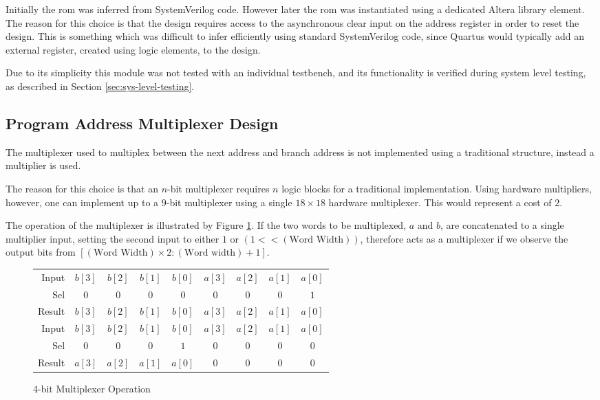 Initially the \gls{rom} was inferred from SystemVerilog code. However later the \gls{rom} was instantiated using a dedicated Altera library element. The reason for this choice is that the design requires access to the asynchronous clear input on the address register in order to reset the design. This is something which was difficult to infer efficiently using standard SystemVerilog code, since Quartus would typically add an external register, created using logic elements, to the design.

Due to its simplicity this module was not tested with an individual testbench, and its functionality is verified during system level testing, as described in Section \ref{sec:sys-level-testing}.

\subsection{Program Address Multiplexer Design} \label{sec:mux-design}
The multiplexer used to multiplex between the next address and branch address is not implemented using a traditional structure, instead a multiplier is used.

The reason for this choice is that an $n$-bit multiplexer requires $n$ logic blocks for a traditional implementation. Using hardware multipliers, however, one can implement up to a $9$-bit multiplexer using a single $18 \times 18$ hardware multiplexer. This would represent a cost of $2$.

The operation of the multiplexer is illustrated by Figure \ref{fig:mux-operation}. If the two words to be multiplexed, $a$ and $b$, are concatenated to a single multiplier input, setting the second input to either $1$ or $(1 << (\text{Word Width}))$, therefore acts as a multiplexer if we observe the output bits from $[(\text{Word Width}) \times 2: (\text{Word width}) + 1]$.

\begin{figure}[ht]
	\centering
	\begin{tabular}{r *{8}{|c}}
		Input & $b[3]$ & $b[2]$ & $b[1]$ & $b[0]$ & $a[3]$ & $a[2]$ & $a[1]$ & $a[0]$ \\
		Sel & $0$ & $0$ & $0$ & $0$ & $0$ & $0$ & $0$ & $1$  \\
		Result & \shadeCell $b[3]$ & \shadeCell $b[2]$ & \shadeCell $b[1]$ & \shadeCell $b[0]$ & $a[3]$ & $a[2]$ & $a[1]$ & $a[0]$ \\
		\midrule
		Input & $b[3]$ & $b[2]$ & $b[1]$ & $b[0]$ & $a[3]$ & $a[2]$ & $a[1]$ & $a[0]$ \\
		Sel & $0$ & $0$ & $0$ & $1$ & $0$ & $0$ & $0$ & $0$  \\
		Result & \shadeCell $a[3]$ & \shadeCell $a[2]$ & \shadeCell $a[1]$ & \shadeCell $a[0]$ & $0$ & $0$  & $0$  & $0$  \\
	\end{tabular}
	\caption{4-bit Multiplexer Operation}
	\label{fig:mux-operation}
\end{figure}

